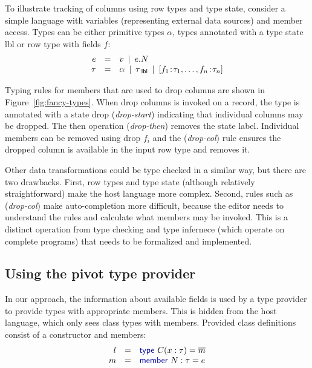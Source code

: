 \documentclass[a4paper,UKenglish]{lipics-v2016}
\theoremstyle{plain}
\theoremstyle{definition}
\newcommand{\lsep}{~\,|\,~}
\newcommand{\kvd}[1]{\textnormal{\textcolor{kvdclr}{\sffamily #1}}}
\newcommand{\ident}[1]{\textnormal{\sffamily #1}}
\newcommand{\qident}[1]{\textnormal{\sffamily \guillemotleft #1\guillemotright}}
\begin{document}
To illustrate tracking of columns using row types and type state, consider a simple language with
variables (representing external data sources) and member access. Types can be either primitive 
types $\alpha$, types annotated with a type state \ident{lbl} or row type with fields $f$:
%
\begin{equation*}
\begin{array}{rcl}  
e&=&v \lsep e.N\\
\tau&=&\alpha \lsep \tau_\ident{lbl} \lsep [f_1\!:\!\tau_1, \ldots, f_n\!:\!\tau_n] 
\end{array}  
\end{equation*}

\noindent
Typing rules for members that are used to drop columns are shown in Figure~\ref{fig:fancy-types}.
When \qident{drop columns} is invoked on a record, the type is annotated with a state \ident{drop}
(\emph{drop-start}) indicating that individual columns may be dropped. The \ident{then} 
operation (\emph{drop-then}) removes the state label. Individual members can be removed using
\qident{drop $f_i$} and the (\emph{drop-col}) rule ensures the dropped column is available in the
input row type and removes it.

Other data transformations could be type checked in a similar way, but there are two drawbacks.
First, row types and type state (although relatively straightforward) make the host language more
complex. Second, rules such as (\emph{drop-col}) make auto-completion more difficult, because the
editor needs to understand the rules and calculate what members may be invoked. This is a distinct
operation from type checking and type infernece (which operate on complete programs) that needs 
to be formalized and implemented.


\subsection{Using the pivot type provider}
\label{sec:columns-tp}

In our approach, the information about available fields is used by a type provider to provide
types with appropriate members. This is hidden from the host language, which only sees class types
with members. Provided class definitions consist of a constructor and members: 
%
\begin{equation*}
\begin{array}{rcl}
 l &=& \kvd{type}~C(x:\tau) = \overline{m} \\
 m &=& \kvd{member}~N:\tau= e
\end{array}
\end{equation*}
\end{document}
